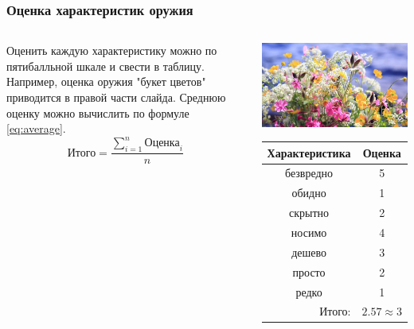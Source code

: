 \begin{frame}
    \frametitle{Оценка характеристик оружия}

    \begin{columns}
            Оценить каждую характеристику можно по пятибалльной шкале и свести в таблицу. Например, оценка оружия \alert{"букет цветов"} приводится в правой части слайда. Среднюю оценку можно вычислить по формуле \eqref{eq:average}. 
            \begin{equation}
                \label{eq:average}
                \text{Итого}=\frac{\displaystyle\sum_{i=1}^{n}\text{Оценка}_i}{n}
            \end{equation}
            
            
            \begin{center}
                \includegraphics[width=.4\textheight]{fig/flowers}
                
                \begin{tabular}{c|c}
                    \hline\hline
                    Характеристика              & Оценка\\ \hline\hline
                    безвредно                   & 5 \\
                    обидно                      & 1 \\
                    скрытно                     & 2 \\
                    носимо                      & 4 \\
                    дешево                      & 3 \\
                    просто                      & 2 \\ 
                    редко                       & 1 \\ \hline
                    \multicolumn{1}{r|}{Итого:} & $2.57\approx 3$ \\
                \end{tabular}
            \end{center}
    \end{columns}    
\end{frame}


